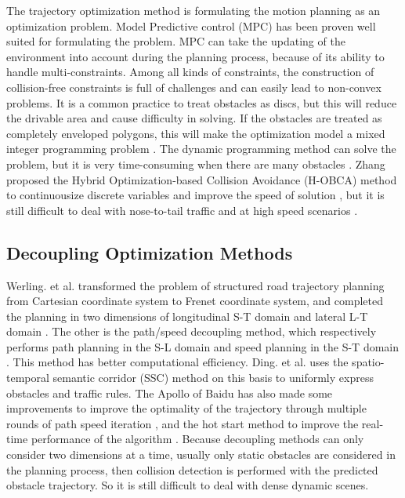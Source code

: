 \documentclass[conference]{IEEEtran}
\begin{document}
The trajectory optimization method is formulating the motion planning as an optimization problem. Model Predictive control (MPC) has been proven well suited for formulating the problem\cite{andersen2019trajectory}. MPC can take the updating of the environment into account during the planning process, because of its ability to handle multi-constraints\cite{schwarting2017safe}.
%
Among all kinds of constraints, the construction of collision-free constraints is full of challenges and can easily lead to non-convex problems\cite{rosmann2017kinodynamic}.
It is a common practice to treat obstacles as discs, but this will reduce the drivable area and cause difficulty in solving. If the obstacles are treated as completely enveloped polygons, this will make the optimization model a mixed integer programming problem \cite{da2019collision}. The dynamic programming method can solve the problem, but it is very time-consuming when there are many obstacles \cite{richards2005mixed}. Zhang proposed the Hybrid Optimization-based Collision Avoidance (H-OBCA) method to continuousize discrete variables and improve the speed of solution \cite{zhang2018autonomous}, but it is still difficult to deal with nose-to-tail traffic and at high speed scenarios \cite{mayne2000constrained} .

\subsection{Decoupling Optimization Methods}
Werling. et al. transformed the problem of structured road trajectory planning from Cartesian coordinate system to Frenet coordinate system, and completed the planning in two dimensions of longitudinal S-T domain and lateral L-T domain \cite{werling2012optimal}. The other is the path/speed decoupling method, which respectively performs path planning in the S-L domain and speed planning in the S-T domain \cite{xu2012real}. This method has better computational efficiency. Ding. et al. uses the spatio-temporal semantic corridor (SSC) method on this basis to uniformly express obstacles and traffic rules. The Apollo of Baidu has also made some improvements to improve the optimality of the trajectory through multiple rounds of path speed iteration \cite{fan2018baidu}\cite{zhou2020dl}, and the hot start method to improve the real-time performance of the algorithm \cite{he2020tdr}. Because decoupling methods can only consider two dimensions at a time, usually only static obstacles are considered in the planning process, then collision detection is performed with the predicted obstacle trajectory. So it is still difficult to deal with dense dynamic scenes.
\end{document}
